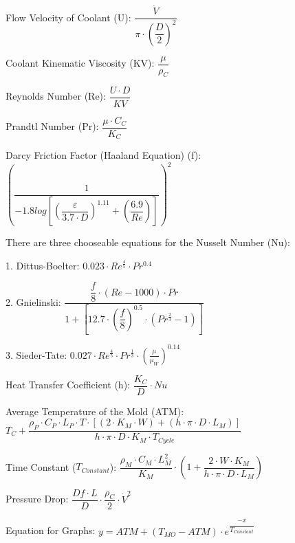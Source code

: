 \documentclass[a4paper,12pt]{article}
\begin{document}
\medskip

Flow Velocity of Coolant (U): $\dfrac{\dot{V}}{\pi \cdot (\dfrac{D}{2})^{2}}$

\medskip

Coolant Kinematic Viscosity (KV): $\dfrac{\mu}{\rho_{C}}$

\medskip

Reynolds Number (Re): $\dfrac{U \cdot D}{KV}$

\medskip

Prandtl Number (Pr): $\dfrac{\mu \cdot C_{C}}{K_{C}}$

\medskip

Darcy Friction Factor (Haaland Equation) (f): $(\dfrac{1}{-1.8log[(\dfrac{\varepsilon}{3.7 \cdot D})^{1.11}+(\dfrac{6.9}{Re})]})^{2}$

\medskip

There are three chooseable equations for the Nusselt Number (Nu):

1. Dittus-Boelter: $0.023 \cdot Re^{\frac{4}{5}} \cdot Pr^{0.4}$

\medskip

2. Gnielinski: $\dfrac{\dfrac{f}{8} \cdot (Re-1000) \cdot Pr}{1 + [12.7 \cdot (\dfrac{f}{8})^{0.5} \cdot (Pr^{\frac{2}{3}}-1)]}$

\medskip

3. Sieder-Tate: $0.027 \cdot Re^{\frac{4}{5}} \cdot Pr^{\frac{1}{3}} \cdot (\frac{\mu}{\mu_{W}})^{0.14}$

\medskip

Heat Transfer Coefficient (h): $\dfrac{K_{C}}{D} \cdot Nu$

\medskip

Average Temperature of the Mold (ATM): $T_{C} + \dfrac{\rho_{P} \cdot C_{P} \cdot L_{P} \cdot T \cdot [(2 \cdot K_{M} \cdot W) + (h \cdot \pi \cdot D \cdot L_{M})]}{h \cdot \pi \cdot D \cdot K_{M} \cdot T_{Cycle}}$ 

\medskip

Time Constant ($T_{Constant}$): $\dfrac{\rho_{M} \cdot C_{M} \cdot L_{M}^{2}}{K_{M}} \cdot (1 + \dfrac{2 \cdot W \cdot K_{M}}{h \cdot \pi \cdot D \cdot L_{M}})$

\medskip

Pressure Drop: $\dfrac{Df \cdot L}{D} \cdot \dfrac{\rho_{C}}{2} \cdot \dot{V}^{2}$

\medskip

Equation for Graphs: $y = ATM + (T_{MO} - ATM) \cdot e^{\dfrac{-x}{T_{Constant}}}$

\clearpage
\end{document}
